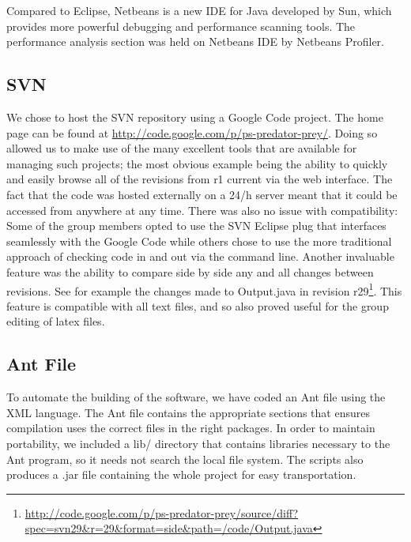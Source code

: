 \documentclass[11pt]{report}
\begin{document}
Compared to Eclipse, Netbeans is a new IDE for Java developed by Sun, which provides more powerful debugging and performance scanning tools. The performance analysis section was held on Netbeans IDE by Netbeans Profiler.  
     
     
      \subsection{SVN} %
      
	We chose to host the SVN repository using a Google Code project. The home page can be found at \href{http://code.google.com/p/ps-predator-prey/}{http://code.google.com/p/ps-predator-prey/}. Doing so allowed us to make use of the many excellent tools that are available for managing such projects; the most obvious example being the ability to quickly and easily browse all of the revisions from r1 current via the web interface.  The fact that the code was hosted externally on a 24/h server meant that it could be accessed from anywhere at any time. There was also no issue with compatibility: Some of the group members opted to use the SVN Eclipse plug that interfaces seamlessly with the Google Code while others chose to use the more traditional approach of checking code in and out via the command line. Another invaluable feature was the ability to compare side by side any and all changes between revisions. 
	See for example the changes made to Output.java in revision r29\footnote{\href{http://code.google.com/p/ps-predator-prey/source/diff?spec=svn29\&r=29\&format=side\&path=/code/Output.java}{http://code.google.com/p/ps-predator-prey/source/diff?spec=svn29\&r=29\&format=side\&path=/code/Output.java}}.
	 This feature is compatible with all text files, and so also proved useful for the group editing of latex files.	   
 
      
      \subsection{Ant File} %
To automate the building of the software, we have coded an Ant file using the XML language. The Ant file contains the appropriate sections that ensures compilation uses the correct files in the right packages. In order to maintain portability, we included a lib/ directory that contains libraries necessary to the Ant program, so it needs not search the local file system. The scripts also produces a .jar file containing the whole project for easy transportation.  
 
\end{document}
